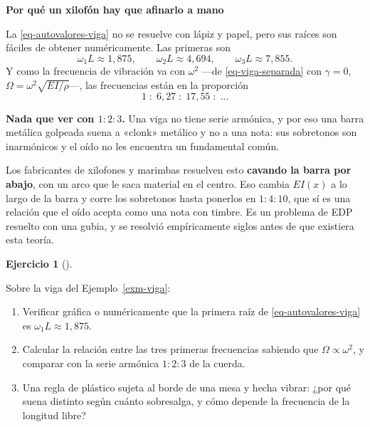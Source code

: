 \documentclass[
  spanish,
  a4paper,
]{scrbook}
\providecommand{\tightlist}{%
  \setlength{\itemsep}{0pt}\setlength{\parskip}{0pt}}
\theoremstyle{definition}
\theoremstyle{plain}
\theoremstyle{definition}
\theoremstyle{plain}
\theoremstyle{definition}
\newtheorem{exercise}{Ejercicio}[chapter]
\theoremstyle{remark}
\begin{document}
\begin{tcolorbox}[enhanced jigsaw, arc=.35mm, bottomrule=.15mm, breakable, colback=white, colframe=quarto-callout-important-color-frame, left=2mm, leftrule=.75mm, opacityback=0, rightrule=.15mm, toprule=.15mm]
\begin{minipage}[t]{5.5mm}
\textcolor{quarto-callout-important-color}{\faExclamation}
\end{minipage}%
\begin{minipage}[t]{\textwidth - 5.5mm}

\vspace{-3mm}\textbf{Por qué un xilofón hay que afinarlo a mano}\vspace{3mm}

La \ref{eq-autovalores-viga} no se resuelve con lápiz y papel, pero sus
raíces son fáciles de obtener numéricamente. Las primeras son \[
\omega_1L \approx 1{,}875, \qquad \omega_2L \approx 4{,}694, \qquad \omega_3L \approx 7{,}855 .
\] Y como la frecuencia de vibración va con \(\omega^2\) ---de
\ref{eq-viga-separada} con \(\gamma=0\),
\(\Omega = \omega^2\sqrt{EI/\rho}\)---, las frecuencias están en la
proporción \[
1 \;:\; 6{,}27 \;:\; 17{,}55 \;:\; \dots
\]

\textbf{Nada que ver con \(1:2:3\).} Una viga no tiene serie armónica, y
por eso una barra metálica golpeada suena a «clonk» metálico y no a una
nota: sus sobretonos son inarmónicos y el oído no les encuentra un
fundamental común.

Los fabricantes de xilofones y marimbas resuelven esto \textbf{cavando
la barra por abajo}, con un arco que le saca material en el centro. Eso
cambia \(EI(x)\) a lo largo de la barra y corre los sobretonos hasta
ponerlos en \(1:4:10\), que sí es una relación que el oído acepta como
una nota con timbre. Es un problema de EDP resuelto con una gubia, y se
resolvió empíricamente siglos antes de que existiera esta teoría.

\end{minipage}%
\end{tcolorbox}

\begin{exercise}[]\protect\hypertarget{exr-viga-numeros}{}\label{exr-viga-numeros}

Sobre la viga del Ejemplo~\ref{exm-viga}:

\begin{enumerate}
\def\labelenumi{\alph{enumi}.}
\tightlist
\item
  Verificar gráfica o numéricamente que la primera raíz de
  \ref{eq-autovalores-viga} es \(\omega_1L \approx 1{,}875\).
\item
  Calcular la relación entre las tres primeras frecuencias sabiendo que
  \(\Omega \propto \omega^2\), y comparar con la serie armónica
  \(1:2:3\) de la cuerda.
\item
  Una regla de plástico sujeta al borde de una mesa y hecha vibrar: ¿por
  qué suena distinto según cuánto sobresalga, y cómo depende la
  frecuencia de la longitud libre?
\end{enumerate}

\end{exercise}
\end{document}
